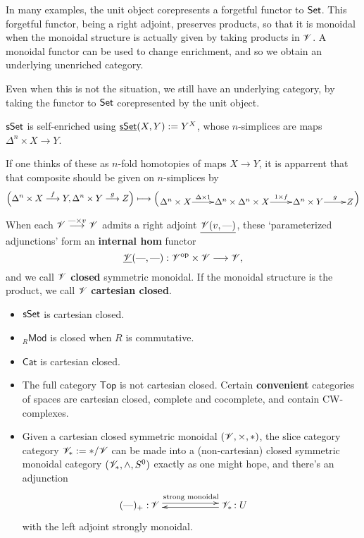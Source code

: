 \documentclass[11pt]{article}
\begin{document}
\begin{4. Basic concepts in enriched category theory}
\begin{itemise}
In many examples, the unit object corepresents a forgetful functor to $\operatorname{{\mathsf{Set}}}$. This forgetful functor, being a right adjoint, preserves products, so that it is monoidal when the monoidal structure is actually given by taking products in $\mathscr{V}$. A monoidal functor can be used to change enrichment, and so we obtain an underlying unenriched category.

Even when this is not the situation, we still have an underlying category, by taking the functor to $\operatorname{{\mathsf{Set}}}$ corepresented by the unit object.
\item $\operatorname{{\mathsf{sSet}}}$ is self-enriched using $\underline{\operatorname{{\mathsf{sSet}}}}(X,Y):=Y^X$, whose $n$-simplices are maps $\Delta^n\times X\to Y$.

If one thinks of these as $n$-fold homotopies of maps $X\to Y$, it is apparrent that that composite should be given on $n$-simplices by
\[\left(\Delta^n\times X\overset{f}{\to}Y,\Delta^n\times Y\overset{g}{\to}Z\right)\mapsto
\left(\vcenter{\xymatrix@1{
\Delta^n\times X
\ar[r]^-{\Delta\times1}
&%
\Delta^n\times \Delta^n\times X
\ar[r]^-{1\times f}
&%
\Delta^n\times Y
\ar[r]^-{g}
&%
Z%
}}\right)\]
\item When each $\mathscr{V}\overset{\textup{---} \times v}{\longrightarrow}\mathscr{V}$ admits a right adjoint $\underline{\mathscr{V}(v,\textup{---} )}$, these `parameterized adjunctions' form an \textbf{internal hom} functor
\[\underline{\mathscr{V}}(\textup{---} ,\textup{---} ):\mathscr{V}^{\textup{op}}\times \mathscr{V}\longrightarrow\mathscr{V},\]
and we call $\mathscr{V}$ \textbf{closed} symmetric monoidal. If the monoidal structure is the product, we call $\mathscr{V}$ \textbf{cartesian closed}.
\item 
\begin{itemize}\squishlist
\setlength{\parindent}{.25in}
\item $\operatorname{{\mathsf{sSet}}}$ is cartesian closed.
\item ${{_R}\mathsf{Mod}}$ is closed when $R$ is commutative.
\item $\mathsf{Cat}$ is cartesian closed.
\item The full category $\mathsf{Top}$ is not cartesian closed. Certain \textbf{convenient} categories of spaces are cartesian closed, complete and cocomplete, and contain CW-complexes.
\item Given a cartesian closed symmetric monoidal $(\mathscr{V},\times ,*)$, the slice category category $\mathscr{V}_*:=*/\mathscr{V}$ can be made into a (non-cartesian) closed symmetric monoidal category $(\mathscr{V}_*,\wedge ,S^0)$ exactly as one might hope, and there's an adjunction
\[\xymatrix@R=.3cm@C=2cm{
\makebox[0cm][r]{$(\DASH )_+:$\,}\scrV  \ar@<.6ex>[r]^{\textup{strong monoidal}}&
\scrV_*\makebox[0cm][l]{\,$:U$}  \ar@<.4ex>[l]\\
}\]
with the left adjoint strongly monoidal.
\end{itemize}
\end{itemise}

\end{4. Basic concepts in enriched category theory}
\end{document}
